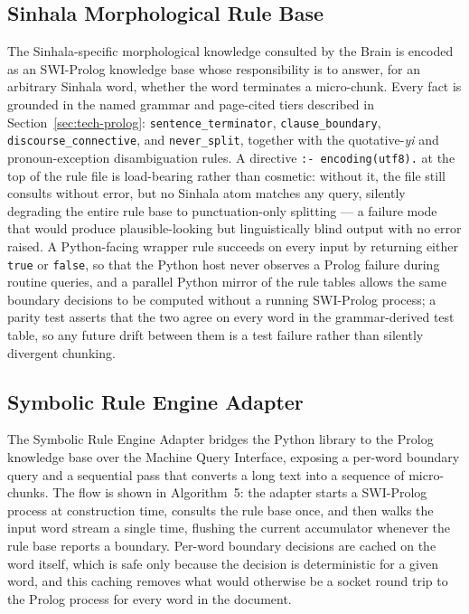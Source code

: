 \documentclass[12pt,a4paper,oneside]{report}
\begin{document}
\subsection{Sinhala Morphological Rule Base}
\label{sec:impl-rule-base}
The Sinhala-specific morphological knowledge consulted by the Brain is encoded as an SWI-Prolog knowledge base whose responsibility is to answer, for an arbitrary Sinhala word, whether the word terminates a micro-chunk. Every fact is grounded in the named grammar and page-cited tiers described in Section~\ref{sec:tech-prolog}: \texttt{sentence\_terminator}, \texttt{clause\_boundary}, \texttt{discourse\_connective}, and \texttt{never\_split}, together with the quotative-\textit{yi} and pronoun-exception disambiguation rules. A directive \texttt{:- encoding(utf8).} at the top of the rule file is load-bearing rather than cosmetic: without it, the file still consults without error, but no Sinhala atom matches any query, silently degrading the entire rule base to punctuation-only splitting — a failure mode that would produce plausible-looking but linguistically blind output with no error raised. A Python-facing wrapper rule succeeds on every input by returning either \texttt{true} or \texttt{false}, so that the Python host never observes a Prolog failure during routine queries, and a parallel Python mirror of the rule tables allows the same boundary decisions to be computed without a running SWI-Prolog process; a parity test asserts that the two agree on every word in the grammar-derived test table, so any future drift between them is a test failure rather than silently divergent chunking.

\subsection{Symbolic Rule Engine Adapter}
\label{sec:impl-prolog-adapter}
The Symbolic Rule Engine Adapter bridges the Python library to the Prolog knowledge base over the Machine Query Interface, exposing a per-word boundary query and a sequential pass that converts a long text into a sequence of micro-chunks. The flow is shown in Algorithm~5: the adapter starts a SWI-Prolog process at construction time, consults the rule base once, and then walks the input word stream a single time, flushing the current accumulator whenever the rule base reports a boundary. Per-word boundary decisions are cached on the word itself, which is safe only because the decision is deterministic for a given word, and this caching removes what would otherwise be a socket round trip to the Prolog process for every word in the document.
\end{document}
